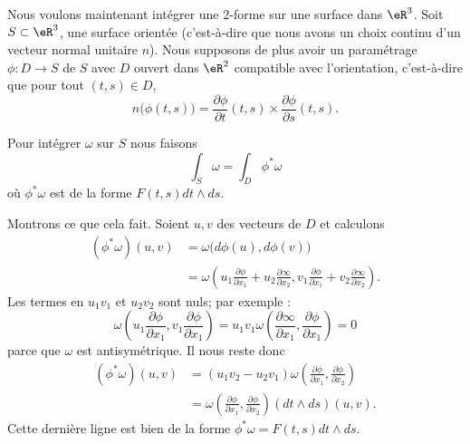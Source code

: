 Nous voulons maintenant intégrer une \( 2\)-forme sur une surface dans \( \eR^3\). Soit \( S\subset \eR^3\), une surface orientée (c'est-à-dire que nous avons un choix continu d'un vecteur normal unitaire \( n\)). Nous supposons de plus avoir un paramétrage \( \phi\colon D\to S\) de \( S\) avec \( D\) ouvert dans \( \eR^2\) compatible avec l'orientation, c'est-à-dire que pour tout \( (t,s)\in D\),
\begin{equation}
	n\big( \phi(t,s) \big)=\frac{ \partial \phi }{ \partial t }(t,s)\times \frac{ \partial \phi }{ \partial s }(t,s).
\end{equation}

\begin{definition}
	Pour intégrer \( \omega\) sur \( S\) nous faisons
	\begin{equation}
		\int_S\omega=\int_D\phi^*\omega
	\end{equation}
	où \( \phi^*\omega\) est de la forme \( F(t,s)dt\wedge ds\).
\end{definition}
Montrons ce que cela fait. Soient \( u,v\) des vecteurs de \( D\) et calculons
\begin{subequations}
	\begin{align}
		(\phi^*\omega)(u,v) & =\omega\big( d\phi(u),d\phi(v) \big)                                                                                                                                                                    \\
		                    & =\omega\left(    u_1\frac{ \partial \phi }{ \partial x_1 }+u_2\frac{ \partial \infty }{ \partial x_2 },v_1\frac{ \partial \phi }{ \partial x_1 }+v_2\frac{ \partial \infty }{ \partial x_2 }   \right).
	\end{align}
\end{subequations}
Les termes en \( u_1v_1\) et \( u_2v_2\) sont nuls; par exemple :
\begin{equation}
	\omega\left( u_1\frac{ \partial \phi }{ \partial x_1 },v_1\frac{ \partial \phi }{ \partial x_1 } \right)=u_1v_1\omega\left( \frac{ \partial \infty }{ \partial x_1 },\frac{ \partial \phi }{ \partial x_1 } \right)=0
\end{equation}
parce que \( \omega\) est antisymétrique. Il nous reste donc
\begin{subequations}
	\begin{align}
		(\phi^*\omega)(u,v) & =(u_1v_2-u_2v_1)\omega\left( \frac{ \partial \phi }{ \partial x_1 },\frac{ \partial \phi }{ \partial x_2 } \right)     \\
		                    & =\omega\left( \frac{ \partial \phi }{ \partial x_1 },\frac{ \partial \phi }{ \partial x_2 } \right)(dt\wedge ds)(u,v).
	\end{align}
\end{subequations}
Cette dernière ligne est bien de la forme \( \phi^*\omega=F(t,s)dt\wedge ds\).

